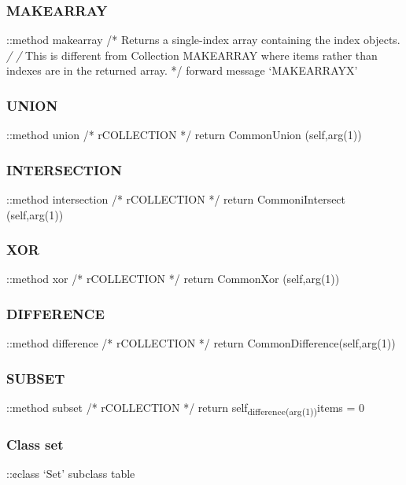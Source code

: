 \subsubsection{MAKEARRAY}\label{makearray}

::method makearray /* Returns a single-index array containing the index
objects. \emph{/ /} This is different from Collection MAKEARRAY where
items rather than indexes are in the returned array. */ forward message
`MAKEARRAYX'

\subsubsection{UNION}\label{union}

::method union /* rCOLLECTION */ return CommonUnion (self,arg(1))

\subsubsection{INTERSECTION}\label{intersection}

::method intersection /* rCOLLECTION */ return CommoniIntersect
(self,arg(1))

\subsubsection{XOR}\label{xor}

::method xor /* rCOLLECTION */ return CommonXor (self,arg(1))

\subsubsection{DIFFERENCE}\label{difference}

::method difference /* rCOLLECTION */ return
CommonDifference(self,arg(1))

\subsubsection{SUBSET}\label{subset}

::method subset /* rCOLLECTION */ return
self\textsubscript{difference(arg(1))}items = 0

\subsubsection{Class set}\label{class-set}

::¢class `Set' subclass table


